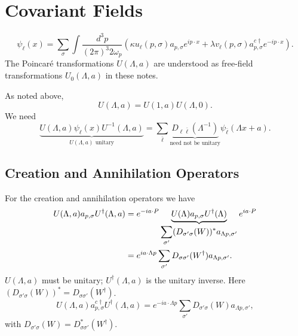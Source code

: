 \section{Covariant Fields}
\begin{equation}
    \psi_\ell(x) = \sum_\sigma \int \frac{d^3 p}{(2 \pi)^3 2 \omega_p} \left(\kappa u_\ell(p, \sigma) a_{p, \sigma} e^{i p \cdot x} + \lambda v_\ell(p, \sigma) a^{c \dagger}_{p, \sigma} e^{ - i p \cdot x} \right).
\end{equation}
The Poincar\'e transformations $U(\Lambda, a)$ are understood as free-field transformations $U_0(\Lambda, a)$ in these notes.

As noted above,
\begin{equation}
    U(\Lambda, a) = U(1, a) U(\Lambda, 0).
\end{equation}
We need
\begin{equation}
    \underbrace{U(\Lambda, a) \psi_\ell(x) U^{ - 1} (\Lambda, a)}_{ U(\Lambda, a) \text{ unitary}} = \sum_{\bar\ell} \underbrace{D_{\ell \bar\ell} (\Lambda^{ - 1})}_{ \text{need not be unitary}} \psi_{\bar\ell} (\Lambda x + a).
\end{equation}
\subsection{Creation and Annihilation Operators}
For the creation and annihilation operators we have
\begin{align}
    U(\Lambda, a) a_{p, \sigma} U^\dagger(\Lambda, a) & = e^{ - i a \cdot P} \underbrace{U(\Lambda) a_{p, \sigma} U^\dagger(\Lambda)}_{ \displaystyle \sum_{\sigma'} (D_{\sigma' \sigma} (W))^* a_{\Lambda p, \sigma'}} e^{i a \cdot P} \notag \\
    & = e^{i a \cdot \Lambda p} \sum_{\sigma'} D_{\sigma \sigma'} (W^\dagger) a_{\Lambda p, \sigma'}.
\end{align}
$U(\Lambda, a)$ must be unitary; $U^\dagger(\Lambda, a)$ is the unitary inverse. Here $(D_{\sigma' \sigma} (W))^* = D_{\sigma \sigma'} (W^\dagger)$.
\begin{equation}
    U(\Lambda, a) a^{c \dagger}_{p, \sigma} U^\dagger(\Lambda, a) = e^{ - i a \cdot \Lambda p} \sum_{\sigma'} D_{\sigma' \sigma} (W) a_{\Lambda p, \sigma'}, %
\end{equation}
with $D_{\sigma' \sigma} (W) = D^*_{\sigma \sigma'} (W^\dagger)$.
